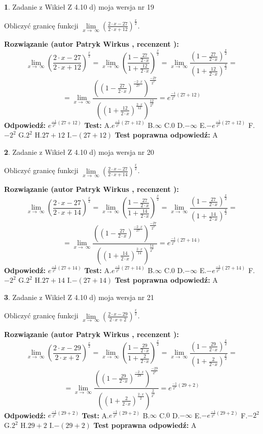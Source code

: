 \documentclass[12pt, a4paper]{article}
\theoremstyle{definition} %
\newtheorem{zad}{}
\newcommand{\zadStart}[1]{\begin{zad}#1\newline}
\newcommand{\zadStop}{\end{zad}}
\newcommand{\rozwStart}[2]{\noindent \textbf{Rozwiązanie (autor #1 , recenzent #2): }\newline}
\newcommand{\rozwStop}{\newline}
\newcommand{\odpStart}{\noindent \textbf{Odpowiedź:}\newline}
\newcommand{\odpStop}{\newline}
\newcommand{\testStart}{\noindent \textbf{Test:}\newline}
\newcommand{\testStop}{\newline}
\newcommand{\kluczStart}{\noindent \textbf{Test poprawna odpowiedź:}\newline}
\newcommand{\kluczStop}{\newline}
\begin{document}
\zadStart{Zadanie z Wikieł Z 4.10 d) moja wersja nr 19}


Obliczyć granicę funkcji  $\lim\limits_{x\to\ \infty}(\frac{2\cdot x-27}{2\cdot x+12})^{\frac{x}{2}}$.
\zadStop
\rozwStart{Patryk Wirkus}{}
$$\lim\limits_{x\to\ \infty}(\frac{2\cdot x-27}{2\cdot x+12})^{\frac{x}{2}} = \lim\limits_{x\to\ \infty}(\frac{1-\frac{27}{2\cdot x}}{1+\frac{12}{2\cdot x}})^{\frac{x}{2}}=\lim\limits_{x\to\ \infty}\frac{(1-\frac{27}{2\cdot x})^{\frac{x}{2}}}{(1+\frac{12}{2\cdot x})^{\frac{x}{2}}}=$$
$$=\lim\limits_{x\to\ \infty}\frac{((1-\frac{27}{2\cdot x})^{\frac{-2\cdot x}{27}})^{\frac{-27}{2^{2}}}}{((1+\frac{12}{2\cdot x})^{\frac{2\cdot x}{12}})^{\frac{12}{2^{2}}}}=e^{\frac{-1}{2^{2}}(27+12)}$$
\rozwStop
\odpStart
$e^{\frac{-1}{2^{2}}(27+12)}$
\odpStop
\testStart
A.$e^{\frac{-1}{2^{2}}(27+12)}$ B.$\infty$ C.$0$ D.$-\infty$ E.$-e^{\frac{-1}{2^{2}}(27+12)}$
F.$-2^{2}$ G.$2^{2}$
H.$27+12$
I.$-(27+12)$
\testStop
\kluczStart
A
\kluczStop



\zadStart{Zadanie z Wikieł Z 4.10 d) moja wersja nr 20}


Obliczyć granicę funkcji  $\lim\limits_{x\to\ \infty}(\frac{2\cdot x-27}{2\cdot x+14})^{\frac{x}{2}}$.
\zadStop
\rozwStart{Patryk Wirkus}{}
$$\lim\limits_{x\to\ \infty}(\frac{2\cdot x-27}{2\cdot x+14})^{\frac{x}{2}} = \lim\limits_{x\to\ \infty}(\frac{1-\frac{27}{2\cdot x}}{1+\frac{14}{2\cdot x}})^{\frac{x}{2}}=\lim\limits_{x\to\ \infty}\frac{(1-\frac{27}{2\cdot x})^{\frac{x}{2}}}{(1+\frac{14}{2\cdot x})^{\frac{x}{2}}}=$$
$$=\lim\limits_{x\to\ \infty}\frac{((1-\frac{27}{2\cdot x})^{\frac{-2\cdot x}{27}})^{\frac{-27}{2^{2}}}}{((1+\frac{14}{2\cdot x})^{\frac{2\cdot x}{14}})^{\frac{14}{2^{2}}}}=e^{\frac{-1}{2^{2}}(27+14)}$$
\rozwStop
\odpStart
$e^{\frac{-1}{2^{2}}(27+14)}$
\odpStop
\testStart
A.$e^{\frac{-1}{2^{2}}(27+14)}$ B.$\infty$ C.$0$ D.$-\infty$ E.$-e^{\frac{-1}{2^{2}}(27+14)}$
F.$-2^{2}$ G.$2^{2}$
H.$27+14$
I.$-(27+14)$
\testStop
\kluczStart
A
\kluczStop



\zadStart{Zadanie z Wikieł Z 4.10 d) moja wersja nr 21}


Obliczyć granicę funkcji  $\lim\limits_{x\to\ \infty}(\frac{2\cdot x-29}{2\cdot x+2})^{\frac{x}{2}}$.
\zadStop
\rozwStart{Patryk Wirkus}{}
$$\lim\limits_{x\to\ \infty}(\frac{2\cdot x-29}{2\cdot x+2})^{\frac{x}{2}} = \lim\limits_{x\to\ \infty}(\frac{1-\frac{29}{2\cdot x}}{1+\frac{2}{2\cdot x}})^{\frac{x}{2}}=\lim\limits_{x\to\ \infty}\frac{(1-\frac{29}{2\cdot x})^{\frac{x}{2}}}{(1+\frac{2}{2\cdot x})^{\frac{x}{2}}}=$$
$$=\lim\limits_{x\to\ \infty}\frac{((1-\frac{29}{2\cdot x})^{\frac{-2\cdot x}{29}})^{\frac{-29}{2^{2}}}}{((1+\frac{2}{2\cdot x})^{\frac{2\cdot x}{2}})^{\frac{2}{2^{2}}}}=e^{\frac{-1}{2^{2}}(29+2)}$$
\rozwStop
\odpStart
$e^{\frac{-1}{2^{2}}(29+2)}$
\odpStop
\testStart
A.$e^{\frac{-1}{2^{2}}(29+2)}$ B.$\infty$ C.$0$ D.$-\infty$ E.$-e^{\frac{-1}{2^{2}}(29+2)}$
F.$-2^{2}$ G.$2^{2}$
H.$29+2$
I.$-(29+2)$
\testStop
\kluczStart
A
\kluczStop
\end{document}
